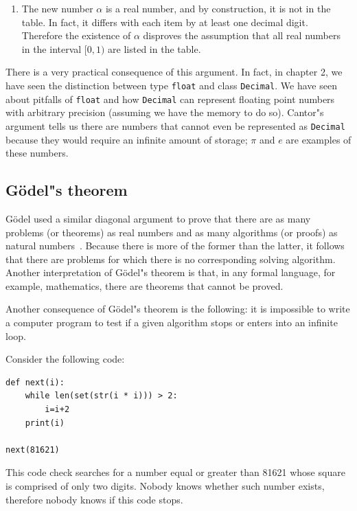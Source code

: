 \documentclass[justified, sixbynine]{tufte-book}
\def\ft{\small\tt}
\theoremstyle{plain}%
\newtheorem * {corollary}{Corollary}
\theoremstyle{definition}
\theoremstyle{remark}
\newtheorem * {remark}{Remark}
\newtheorem * {note}{Note}
\begin{document}
\begin{fullwidth}
\begin{enumerate}
\item  The new number $\alpha $ is a real number, and by construction, it is
not in the table. In fact, it differs with each item by at least one decimal
digit. Therefore the existence of $\alpha $ disproves the assumption that
all real numbers in the interval $[0, 1)$ are listed in the table.
\end{enumerate}

There is a very practical consequence of this argument. In fact, in chapter 2, we have seen the distinction between type {\ft float} and class {\ft Decimal}. We have seen about pitfalls of {\ft float} and how {\ft Decimal} can represent floating point numbers with arbitrary precision (assuming we have the memory to do so). Cantor"s argument tells us there are numbers that cannot even be represented as {\ft Decimal} because they would require an infinite amount of storage; $\pi$ and $e$ are examples of these numbers.

\subsection{G\"odel"s theorem}


G\"odel used a similar diagonal argument to prove that there are as many
problems (or theorems) as real numbers and as many algorithms (or proofs) as
natural numbers~\cite{hofstadter}. Because there is more of the former than the latter, it
follows that there are problems for which there is no corresponding solving
algorithm. Another interpretation of G\"odel"s theorem is that, in any formal
language, for example, mathematics, there are theorems that cannot be proved.

Another consequence of G\"odel"s theorem is the following:
it is impossible to write a computer program to test if a given algorithm
stops or enters into an infinite loop.

Consider the following code:

\begin{lstlisting}
def next(i):
    while len(set(str(i * i))) > 2:
        i=i+2
    print(i)

next(81621)
\end{lstlisting}

This code check searches for a number equal or greater than 81621 whose square is comprised of only two digits. 
Nobody knows whether such number exists, therefore nobody knows if this code stops.


\end{fullwidth}
\end{document}

